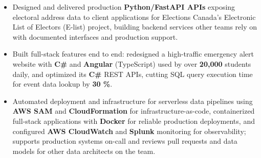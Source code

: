 \documentclass[a4paper]{article}
\begin{document}
\begin{itemize}
\item Designed and delivered production \textbf{Python/FastAPI APIs} exposing electoral address data to client applications for Elections Canada's Electronic List of Electors (E-list) project, building backend services other teams rely on with documented interfaces and production support.

\item Built full-stack features end to end: redesigned a high-traffic emergency alert website with \textbf{C\#} and \textbf{Angular} (TypeScript) used by over \textbf{20,000} students daily, and optimized its \textbf{C\#} REST APIs, cutting SQL query execution time for event data lookup by \textbf{30 \%}.

\item Automated deployment and infrastructure for serverless data pipelines using \textbf{AWS SAM} and \textbf{CloudFormation} for infrastructure-as-code, containerized full-stack applications with \textbf{Docker} for reliable production deployments, and configured \textbf{AWS CloudWatch} and \textbf{Splunk} monitoring for observability; supports production systems on-call and reviews pull requests and data models for other data architects on the team.


\end{itemize}

\end{document}
